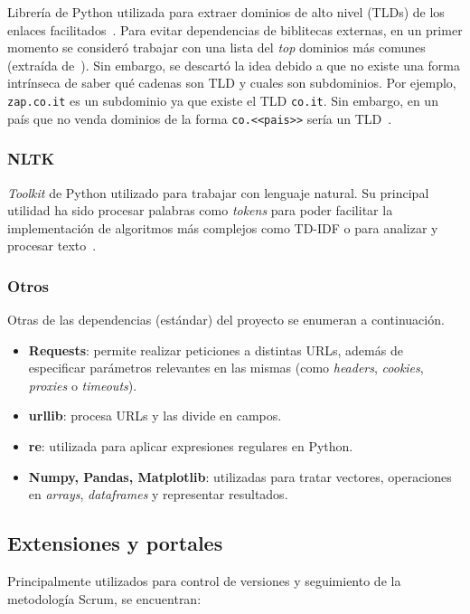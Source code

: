 Librería de Python utilizada para extraer dominios de alto nivel (TLDs) de los enlaces facilitados~\cite{tldLibreria}. Para evitar dependencias de biblitecas externas, en un primer momento se consideró trabajar con una lista del \textit{top} dominios más comunes (extraída de~\cite{tldLista}). Sin embargo, se descartó la idea debido a que no existe una forma intrínseca de saber qué cadenas son TLD y cuales son subdominios. Por ejemplo, \texttt{zap.co.it} es un subdominio ya que existe el TLD \texttt{co.it}. Sin embargo, en un país que no venda dominios de la forma \texttt{co.<<pais>>} sería un TLD~\cite{tldNogenerico}.

\subsubsection{NLTK}

\textit{Toolkit} de Python utilizado para trabajar con lenguaje natural. Su principal utilidad ha sido procesar palabras como \textit{tokens} para poder facilitar la implementación de algoritmos más complejos como TD-IDF o para analizar y procesar texto~\cite{nltk}.

\subsubsection{Otros}

Otras de las dependencias (estándar) del proyecto se enumeran a continuación.

\begin{itemize}
	\item \textbf{Requests}: permite realizar peticiones a distintas URLs, además de especificar parámetros relevantes en las mismas (como \textit{headers}, \textit{cookies}, \textit{proxies} o \textit{timeouts}).
	\item \textbf{urllib}: procesa URLs y las divide en campos.
	\item \textbf{re}: utilizada para aplicar expresiones regulares en Python.
	\item \textbf{Numpy, Pandas, Matplotlib}: utilizadas para tratar vectores, operaciones en \textit{arrays}, \textit{dataframes} y representar resultados.
\end{itemize}


\subsection{Extensiones y portales}

Principalmente utilizados para control de versiones y seguimiento de la metodología Scrum, se encuentran:

